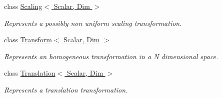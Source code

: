\begin{DoxyCompactItemize}
class \hyperlink{class_scaling}{Scaling$<$ Scalar, Dim $>$}
\begin{DoxyCompactList}\small\item\em Represents a possibly non uniform scaling transformation. \end{DoxyCompactList}\item 
class \hyperlink{class_transform}{Transform$<$ Scalar, Dim $>$}
\begin{DoxyCompactList}\small\item\em Represents an homogeneous transformation in a N dimensional space. \end{DoxyCompactList}\item 
class \hyperlink{class_translation}{Translation$<$ Scalar, Dim $>$}
\begin{DoxyCompactList}\small\item\em Represents a translation transformation. \end{DoxyCompactList}\end{DoxyCompactItemize}
